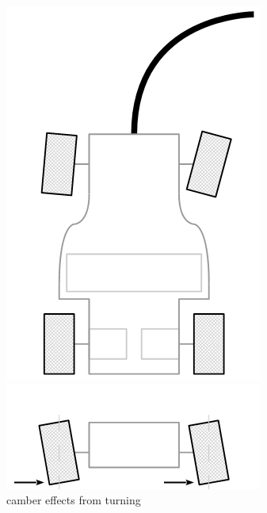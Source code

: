 \documentclass{beamer}
\begin{document}
\begin{frame}
\begin{columns}[t]
\begin{figure}
{    \includegraphics[scale=0.3]{images-dis12/car-top-turning} \\
    }
     {
    \vspace{\baselineskip}
    \includegraphics[scale=0.3]{images-dis12/car-camber-deform} \\
    camber effects from turning
    }
  \end{figure}
\end{columns}
\end{frame}
\end{document}
